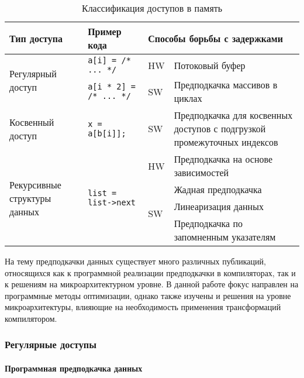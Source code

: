\documentclass[12pt,a4paper]{article}
\begin{document}
\begin{table}[h]
  \begin{center}
    \begin{tabular}{|| m{4cm} | l | l | m{5.5cm} ||}
      \hline
      Тип доступа & Пример кода & \multicolumn{2}{|l|}{Способы борьбы с задержками} \\
      \hline\hline
      \multirow{2}{4cm}{Регулярный доступ} & \texttt{a[i] = /* ... */} & HW & Потоковый буфер \\ \cline{3-4}
                  &  \texttt{a[i * 2] = /* ... */} & SW & Предподкачка массивов в циклах \\
      \hline
      Косвенный доступ & \texttt{x = a[b[i]];} & SW & Предподкачка для косвенных доступов с подгрузкой промежуточных индексов \\
      \hline
      \multirow{4}{4cm}{Рекурсивные структуры данных} & \multirow{4}{*}{\texttt{list = list->next}} & HW & Предподкачка на основе зависимостей \\ \cline{3-4}
                  & & \multirow{3}{*}{SW} & Жадная предподкачка \\
                  & & & Линеаризация данных \\
                  & & & Предподкачка по запомненным указателям \\
      \hline
    \end{tabular}
    \caption{Классификация доступов в память}
    \label{tab:classify}
  \end{center}
\end{table}

На тему предподкачки данных существует много различных публикаций, относящихся как к программной реализации предподкачки в компиляторах, так и к решениям на микроархитектурном уровне. В данной работе фокус направлен на программные методы оптимизации, однако также изучены и решения на уровне микроархитектуры, влияющие на необходимость применения трансформаций компилятором.

\subsubsection{Регулярные доступы}

\paragraph{Программная предподкачка данных}
\end{document}
